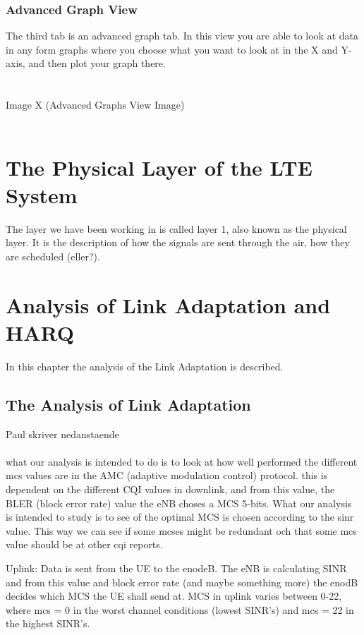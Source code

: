 \documentclass[cropmarks, frame, english]{idamasterthesis}
\begin{document}
\subsection{Advanced Graph View}
The third tab is an advanced graph tab. In this view you are able to look at data in any form graphs where you choose what you want to look at in the X and Y-axis, and then plot your graph there.
\\
\\
\\ 
		Image X (Advanced Graphs View Image)
\\
\\




\chapter{The Physical Layer of the LTE System}
The layer we have been working in is called layer 1, also known as the physical layer. It is the description of how the signals are sent through the air, how they are scheduled (eller?).
 
 
 
 
 
 
\chapter{Analysis of Link Adaptation and HARQ}
In this chapter the analysis of the Link Adaptation is described. 

\section{The Analysis of Link Adaptation}
Paul skriver nedanstaende \\ \\
what our analysis is intended to do is to look at how well performed the different mcs values are in the AMC (adaptive modulation control) protocol. this is dependent on the different CQI values in downlink, and from this value, the BLER (block error rate) value the eNB choses a MCS 5-bits. What our analysis is intended to study is to see of the optimal MCS is chosen according to the sinr value. This way we can see if some mcses might be redundant och that some mcs value should be at other cqi reports. 

Uplink: \newline
Data is sent from the UE to the enodeB. The eNB is calculating SINR and from this value and block error rate (and maybe something more) the enodB decides which MCS the UE shall send at. MCS in uplink varies between 0-22, where mcs = 0 in the worst channel conditions (lowest SINR's) and mcs = 22 in the highest SINR's. 
\end{document}
